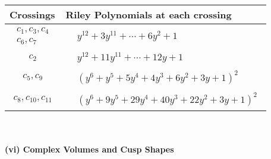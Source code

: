\documentclass[1p]{elsarticle_modified}
\theoremstyle{definition}
\begin{document}
\begin{tabular}{m{50pt}|m{274pt}}
Crossings & \hspace{64pt}Riley Polynomials at each crossing \\
\hline $$\begin{aligned}c_{1},c_{3},c_{4}\\c_{6},c_{7}\end{aligned}$$&$\begin{aligned}
&y^{12}+3 y^{11}+\cdots+6 y^2+1
\end{aligned}$\\
\hline $$\begin{aligned}c_{2}\end{aligned}$$&$\begin{aligned}
&y^{12}+11 y^{11}+\cdots+12 y+1
\end{aligned}$\\
\hline $$\begin{aligned}c_{5},c_{9}\end{aligned}$$&$\begin{aligned}
&(y^6+y^5+5 y^4+4 y^3+6 y^2+3 y+1)^2
\end{aligned}$\\
\hline $$\begin{aligned}c_{8},c_{10},c_{11}\end{aligned}$$&$\begin{aligned}
&(y^6+9 y^5+29 y^4+40 y^3+22 y^2+3 y+1)^2
\end{aligned}$\\
\hline
\end{tabular}\\~\\
\newpage\flushleft \textbf{(vi) Complex Volumes and Cusp Shapes}
\end{document}
